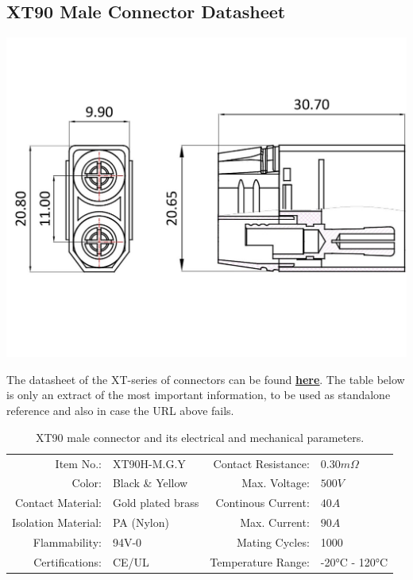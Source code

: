 \clearpage %
\label{xt90}
\subsection{XT90 Male Connector Datasheet}

\includegraphics[width=\textwidth]{contents/figures/xt90_m.jpg}

The datasheet of the XT-series of connectors can be found \href{https://www.lcsc.com/datasheet/lcsc_datasheet_2207062115_Changzhou-Amass-Elec-XT90H-M-G-Y_C3040683.pdf}{\textbf{\underline{here}}}.
The table below is only an extract of the most important information, to be used as standalone reference and also in case the URL above fails.

\begin{table}[h] %
    \begin{tabular}{rlrl}
         Item No.:&  XT90H-M.G.Y &  Contact Resistance:& $0.30m \Omega$\\
         Color:&  Black \& Yellow&  Max. Voltage:& $500V$\\
         Contact Material:&  Gold plated brass&  Continous Current:& $40A$\\
         Isolation Material:&  PA (Nylon)&  Max. Current:& $90A$\\
         Flammability:&  94V-0&  Mating Cycles:& 1000\\
         Certifications:&  CE/UL&  Temperature Range:& -20°C - 120°C\\
    \end{tabular}
    \caption{XT90 male connector and its electrical and mechanical parameters.}
    \label{xt90_m_specs}
\end{table}

\clearpage %



